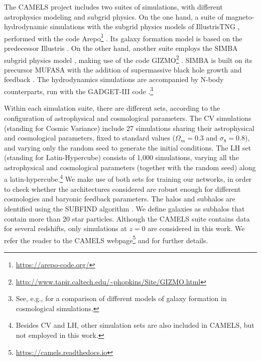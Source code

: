 \documentclass[twocolumn]{aastex631}
\begin{document}
The CAMELS project includes two suites of simulations, with different astrophysics modeling and subgrid physics. On the one hand, a suite of magneto-hydrodynamic simulations with the subgrid physics models of IllustrisTNG \citep{2017MNRAS.465.3291W, 2018MNRAS.473.4077P, 2019ComAC...6....2N}, performed with the code Arepo\footnote{\url{https://arepo-code.org/}} \citep[][see also \citealt{2018MNRAS.475..676S,2018MNRAS.480.5113M,2018MNRAS.477.1206N} for more details]{Weinberger:2019tbd}. Its galaxy formation model is based on the predecessor Illustris \citep{2013MNRAS.436.3031V, 2014Natur.509..177V}. On the other hand, another suite employs the SIMBA subgrid physics model \citep{Dave:2019yyq}, making use of the code
GIZMO\footnote{\url{http://www.tapir.caltech.edu/~phopkins/Site/GIZMO.html}} \citep{Hopkins:2014qka}. SIMBA is built on its precursor MUFASA \citep{2016MNRAS.462.3265D} with the addition of supermassive black hole growth and feedback \citep{2017MNRAS.464.2840A}. The hydrodynamics simulations are accompanied by N-body counterparts, run with the GADGET-III code \citep{Springel:2005mi}.\footnote{See, e.g., \cite{2020NatRP...2...42V} for a comparison of different models of galaxy formation in cosmological simulations.}


Within each simulation suite, there are different sets, according to the configuration of astrophysical and cosmological parameters. The CV simulations (standing for Cosmic Variance) include 27 simulations sharing their astrophysical and cosmological parameters, fixed to standard values ($\Omega_m = 0.3$ and $\sigma_8=0.8$), and varying only the random seed to generate the initial conditions. The LH set (standing for Latin-Hypercube) consists of 1,000 simulations, varying all the astrophysical and cosmological parameters (together with the random seed) along a latin-hypercube.\footnote{Besides CV and LH, other simulation sets are also included in CAMELS, but not employed in this work.} We make use of both sets for training our networks, in order to check whether the architectures considered are robust enough for different cosmologies and baryonic feedback parameters. The halos and subhalos are identified using the \textsc{SUBFIND} algorithm \citep{Subfind}. We define galaxies as subhalos that contain more than 20 star particles. Although the CAMELS suite contains data for several redshifts, only simulations at $z=0$ are considered in this work. We refer the reader to the CAMELS webpage\footnote{\url{https://camels.readthedocs.io}} and \cite{villaescusanavarro2020camels} for further details.
\end{document}

